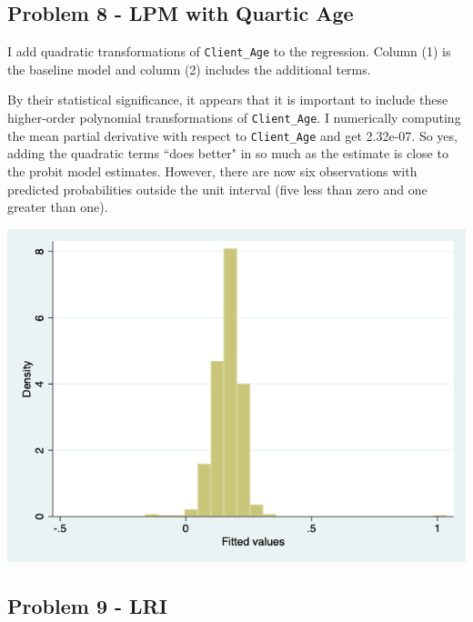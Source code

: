 \documentclass{article}
\begin{document}
\pagebreak

\subsection*{Problem 8 - LPM with Quartic Age}

I add quadratic transformations of \texttt{Client\_Age} to the regression.  Column (1) is the baseline model and column (2) includes the additional terms.

\bigskip

\begin{center}

\end{center}

\bigskip

By their statistical significance, it appears that it is important to include these higher-order polynomial transformations of \texttt{Client\_Age}.  I numerically computing the mean partial derivative with respect to \texttt{Client\_Age} and get 2.32e-07.  So yes, adding the quadratic terms ``does better" in so much as the estimate is close to the probit model estimates.  However, there are now six observations with predicted probabilities outside the unit interval (five less than zero and one greater than one).

\begin{center}
\includegraphics[scale =0.5]{p8_figure}
\end{center}

\subsection*{Problem 9 - LRI}
\end{document}
